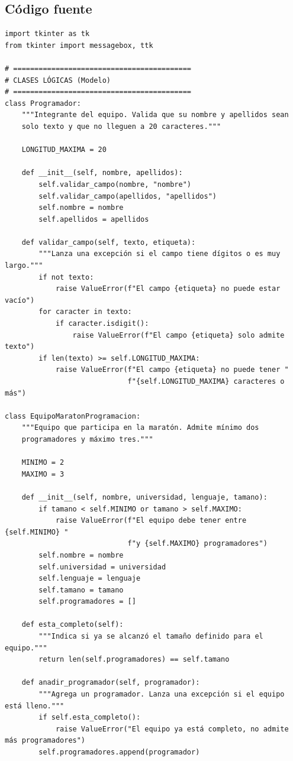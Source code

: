 \documentclass[11pt, a4paper]{article}
\begin{document}
\subsection{Código fuente}
\begin{lstlisting}
import tkinter as tk
from tkinter import messagebox, ttk

# ==========================================
# CLASES LÓGICAS (Modelo)
# ==========================================
class Programador:
    """Integrante del equipo. Valida que su nombre y apellidos sean
    solo texto y que no lleguen a 20 caracteres."""

    LONGITUD_MAXIMA = 20

    def __init__(self, nombre, apellidos):
        self.validar_campo(nombre, "nombre")
        self.validar_campo(apellidos, "apellidos")
        self.nombre = nombre
        self.apellidos = apellidos

    def validar_campo(self, texto, etiqueta):
        """Lanza una excepción si el campo tiene dígitos o es muy largo."""
        if not texto:
            raise ValueError(f"El campo {etiqueta} no puede estar vacío")
        for caracter in texto:
            if caracter.isdigit():
                raise ValueError(f"El campo {etiqueta} solo admite texto")
        if len(texto) >= self.LONGITUD_MAXIMA:
            raise ValueError(f"El campo {etiqueta} no puede tener "
                             f"{self.LONGITUD_MAXIMA} caracteres o más")

class EquipoMaratonProgramacion:
    """Equipo que participa en la maratón. Admite mínimo dos
    programadores y máximo tres."""

    MINIMO = 2
    MAXIMO = 3

    def __init__(self, nombre, universidad, lenguaje, tamano):
        if tamano < self.MINIMO or tamano > self.MAXIMO:
            raise ValueError(f"El equipo debe tener entre {self.MINIMO} "
                             f"y {self.MAXIMO} programadores")
        self.nombre = nombre
        self.universidad = universidad
        self.lenguaje = lenguaje
        self.tamano = tamano
        self.programadores = []

    def esta_completo(self):
        """Indica si ya se alcanzó el tamaño definido para el equipo."""
        return len(self.programadores) == self.tamano

    def anadir_programador(self, programador):
        """Agrega un programador. Lanza una excepción si el equipo está lleno."""
        if self.esta_completo():
            raise ValueError("El equipo ya está completo, no admite más programadores")
        self.programadores.append(programador)


\end{lstlisting}
\end{document}
